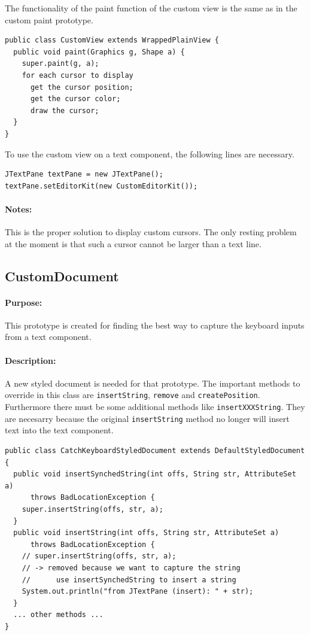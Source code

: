 \documentclass[11pt,a4paper]{article}
\begin{document}
The functionality of the paint function of the custom view is the same as in the custom paint prototype. 
\begin{verbatim}
public class CustomView extends WrappedPlainView {
  public void paint(Graphics g, Shape a) {
    super.paint(g, a);
    for each cursor to display
      get the cursor position;
      get the cursor color;
      draw the cursor;
  }
}
\end{verbatim}

To use the custom view on a text component, the following lines are necessary.
\begin{verbatim}
JTextPane textPane = new JTextPane();
textPane.setEditorKit(new CustomEditorKit());
\end{verbatim}

\paragraph{Notes:}
This is the proper solution to display custom cursors. The only resting problem at the moment is that such a cursor cannot be larger than a text line.




\subsection{CustomDocument}
\paragraph{Purpose:}
This prototype is created for finding the best way to capture the keyboard inputs from a text component.
\paragraph{Description:}
A new styled document is needed for that prototype. The important methods to override in this class are \texttt{insertString}, \texttt{remove} and \texttt{createPosition}. Furthermore there must be some additional methods like \texttt{insertXXXString}. They are necesarry because the original \texttt{insertString} method no longer will insert text into the text component.
\begin{verbatim}
public class CatchKeyboardStyledDocument extends DefaultStyledDocument {
  public void insertSynchedString(int offs, String str, AttributeSet a)
      throws BadLocationException {
    super.insertString(offs, str, a);
  }
  public void insertString(int offs, String str, AttributeSet a)
      throws BadLocationException {
    // super.insertString(offs, str, a);
    // -> removed because we want to capture the string
    //      use insertSynchedString to insert a string
    System.out.println("from JTextPane (insert): " + str);
  }
  ... other methods ...
}\end{verbatim}
\end{document}
